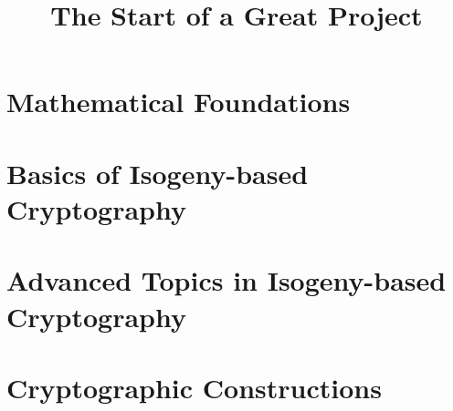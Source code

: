\documentclass[
	twoside=semi,
	areasetadvanced,
	BCOR=10mm,
	USenglish,
	numbers=noendot,
	captions=tableheading,
	fontsize=10pt,
]{scrbook}
\title{The Start of a Great Project}
\date{}
\begin{document}
\maketitle

\frontmatter{}


\partslayout
\setcounter{part}{-1}


\mainmatter{} %

\def\parttext{Part 0}
\part{Mathematical Foundations}\label{part:foundations}




\part{Basics of Isogeny-based Cryptography}\label{part:isogenies}



\part{Advanced Topics in Isogeny-based Cryptography}\label{part:advanced}



\part{Cryptographic Constructions}\label{part:protocols}





\backmatter{}


% 

\sloppy \printbibliography[] \fussy
\end{document}
